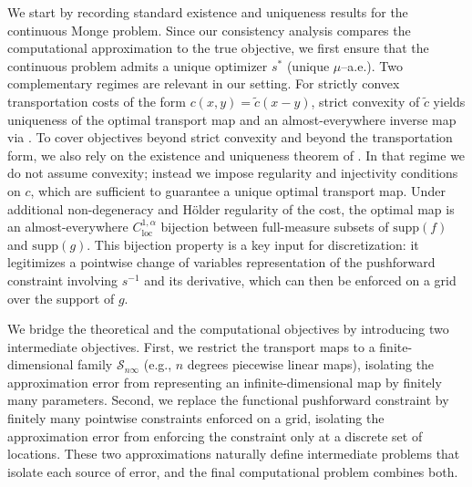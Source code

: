 \documentclass[12pt,leqno]{amsart}
\begin{document}
\begin{enumerate}[leftmargin=*, label=\arabic*.]
We start by recording standard existence and uniqueness results for the continuous Monge problem. Since our consistency analysis compares the computational approximation to the true objective, we first ensure that the continuous problem admits a unique optimizer $s^*$ (unique $\mu$--a.e.). Two complementary regimes are relevant in our setting. For strictly convex transportation costs of the form
$c(x,y)=\tilde c(x-y)$, strict convexity of $\tilde c$ yields uniqueness of the optimal transport map and an almost-everywhere inverse map via \cite{GangboMcCann1996}. To cover objectives beyond strict convexity and beyond the transportation form, we also rely on the existence and uniqueness theorem of \cite{philippis2013regularity}. In that regime we do not assume convexity; instead we impose regularity and injectivity conditions on $c$, which are
sufficient to guarantee a unique optimal transport map. Under additional non-degeneracy and H\"older regularity of the cost, the optimal map is an almost-everywhere $C^{1,\alpha}_{\mathrm{loc}}$ bijection between full-measure subsets of $\mathrm{supp}(f)$ and $\mathrm{supp}(g)$. This bijection property is a key input for discretization: it legitimizes a pointwise change of variables
representation of the pushforward constraint involving $s^{-1}$ and its derivative, which can then be enforced on a grid over the support of $g$.

We bridge the theoretical and the computational objectives by introducing two intermediate objectives. First, we restrict the transport maps to a finite-dimensional family $\mathcal{S}_{n\infty}$ (e.g., $n$ degrees piecewise linear maps), isolating the approximation error from representing an infinite-dimensional map by finitely many parameters. Second, we replace the functional pushforward constraint
by finitely many pointwise constraints enforced on a grid, isolating the approximation error from enforcing the constraint only at a
discrete set of locations. These two approximations naturally define intermediate problems that isolate each source of error, and the
final computational problem combines both.


\end{enumerate}
\end{document}
